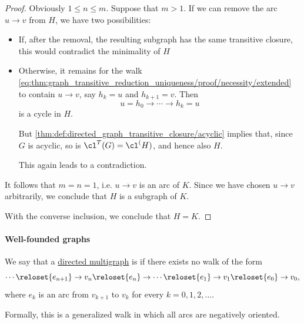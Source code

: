 \begin{proof}
  Obviously \( 1 \leq n \leq m \). Suppose that \( m > 1 \). If we can remove the arc \( u \to v \) from \( H \), we have two possibilities:
  \begin{itemize}
    \item If, after the removal, the resulting subgraph has the same transitive closure, this would contradict the minimality of \( H \)
    \item Otherwise, it remains for the walk \eqref{eq:thm:graph_transitive_reduction_uniqueness/proof/necessity/extended} to contain \( u \to v \), say \( h_k = u \) and \( h_{k+1} = v \). Then
    \begin{equation*}
      u = h_0 \to \cdots \to h_k = u
    \end{equation*}
    is a cycle in \( H \).

    But \cref{thm:def:directed_graph_transitive_closure/acyclic} implies that, since \( G \) is acyclic, so is \( \cl^T(G) = \cl^(H) \), and hence also \( H \).

    This again leads to a contradiction.
  \end{itemize}

  It follows that \( m = n = 1 \), i.e. \( u \to v \) is an arc of \( K \). Since we have chosen \( u \to v \) arbitrarily, we conclude that \( H \) is a subgraph of \( K \).

  With the converse inclusion, we conclude that \( H = K \).
\end{proof}

\paragraph{Well-founded graphs}

\begin{definition}\label{def:well_founded_graph}\mimprovised
  We say that a \hyperref[def:directed_multigraph]{directed multigraph} is  if there exists no walk of the form
  \begin{equation}
    \cdots \reloset {e_{n+1}} \to v_n \reloset {e_n} \to \cdots \reloset {e_1} \to v_1 \reloset {e_0} \to v_0,
  \end{equation}
  where \( e_k \) is an arc from \( v_{k+1} \) to \( v_k \) for every \( k = 0, 1, 2, \ldots \).
\end{definition}
\begin{comments}
  \item Formally, this is a generalized walk in which all arcs are negatively oriented.
\end{comments}


